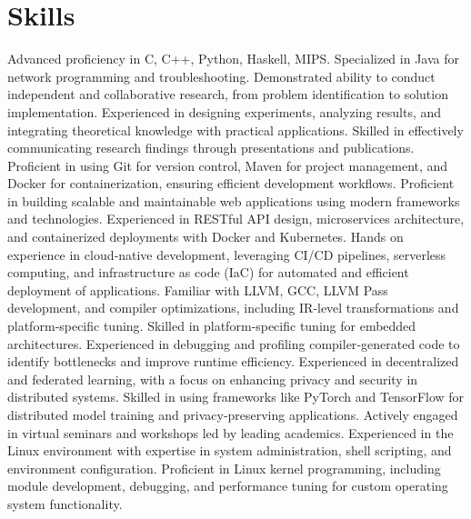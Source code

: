 \section{Skills}
  \resumeSubHeadingListStart
      {Advanced proficiency in C, C++, Python, Haskell, MIPS. Specialized in Java for network programming and troubleshooting.}
      {Demonstrated ability to conduct independent and collaborative research, from problem identification to solution implementation. Experienced in designing experiments, analyzing results, and integrating theoretical knowledge with practical applications. Skilled in effectively communicating research findings through presentations and publications.}
      {Proficient in using Git for version control, Maven for project management, and Docker for containerization, ensuring efficient development workflows.}
      {Proficient in building scalable and maintainable web applications using modern frameworks and technologies. Experienced in RESTful API design, microservices architecture, and containerized deployments with Docker and Kubernetes.}
      {Hands on experience in cloud‑native development, leveraging CI/CD pipelines, serverless computing, and infrastructure as code (IaC) for automated and efficient deployment of applications.}
      {Familiar with LLVM, GCC, LLVM Pass development, and compiler optimizations, including IR‑level transformations and platform‑specific tuning. Skilled in platform‑specific tuning for embedded architectures. Experienced in debugging and profiling compiler‑generated code to identify bottlenecks and improve runtime efficiency.}
      {Experienced in decentralized and federated learning, with a focus on enhancing privacy and security in distributed systems. Skilled in using frameworks like PyTorch and TensorFlow for distributed model training and privacy‑preserving applications. Actively engaged in virtual seminars and workshops led by leading academics.}
      {Experienced in the Linux environment with expertise in system administration, shell scripting, and environment configuration. Proficient in Linux kernel programming, including module development, debugging, and performance tuning for custom operating system functionality.}
  \resumeSubHeadingListEnd